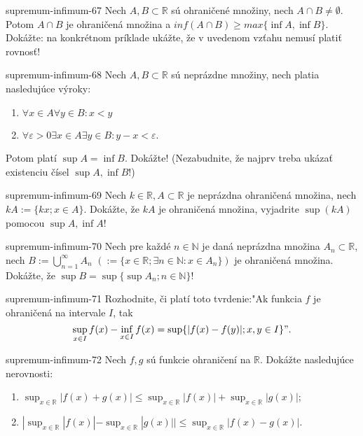 \begin{defproblem}{supremum-infimum-67}
Nech $A,B\subset\mathbb{R}$ sú ohraničené množiny, nech $A\cap B\neq\emptyset$. Potom $A\cap B$ je ohraničená množina a $inf(A\cap B)\geq max \{\inf A,\inf B\}$. Dokážte: na konkrétnom príklade ukážte, že v uvedenom vzťahu nemusí platiť rovnosť!
\end{defproblem}

\begin{defproblem}{supremum-infimum-68}
Nech $A,B\subset\mathbb{R}$ sú neprázdne množiny, nech platia nasledujúce výroky:
\begin{enumerate}
\item $\forall x\in A \forall y\in B: x<y$
\item $\forall \varepsilon>0 \exists x\in A \exists y\in B:y-x<\varepsilon$.
\end{enumerate}
Potom platí $\sup A =\inf B$. Dokážte! (Nezabudnite, že najprv treba ukázať existenciu čísel $\sup A,\inf B$!)
\end{defproblem}

\begin{defproblem}{supremum-infimum-69}
Nech $k\in\mathbb{R},A\subset\mathbb{R}$ je neprázdna ohraničená množina, nech $kA:=\{kx;x\in A\}$. Dokážte, že $kA$ je ohraničená množina, vyjadrite $\sup (kA)$ pomocou $\sup A,\inf A$!
\end{defproblem}

\begin{defproblem}{supremum-infimum-70}
Nech pre každé $n\in\mathbb{N}$ je daná neprázdna množina $A_n\subset\mathbb{R}$, nech $B:=\bigcup_{n=1}^\infty A_n$ $(:=\{x\in\mathbb{R};\exists n\in\mathbb{N}:x\in A_n\})$ je ohraničená množina. Dokážte, že $\sup B= \sup\{\sup A_n;n\in\mathbb{N}\}$!
\end{defproblem}

\begin{defproblem}{supremum-infimum-71}
Rozhodnite, či platí toto tvrdenie:"Ak funkcia $f$ je ohraničená na intervale $I$, tak $$\sup_{x\in I}f(x)-\inf_{x\in I}f(x)=\sup \{|f(x)-f(y)|;x,y\in I\}".$$
\end{defproblem}

\begin{defproblem}{supremum-infimum-72}
Nech $f,g$ sú funkcie ohraničení na $\mathbb{R}$. Dokážte nasledujúce nerovnosti:
\begin{enumerate}
\item $\sup_{x\in\mathbb{R}}|f(x)+g(x)|\leq\sup_{x\in\mathbb{R}}|f(x)|+\sup_{x\in\mathbb{R}}|g(x)|;$
\item $|\sup_{x\in\mathbb{R}}|f(x)|-\sup_{x\in\mathbb{R}}|g(x)||\leq\sup_{x\in\mathbb{R}}|f(x)-g(x)|$.
\end{enumerate}
\end{defproblem}

